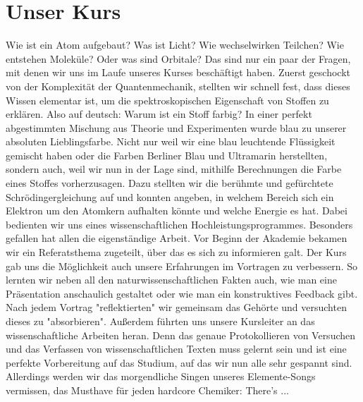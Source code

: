 \section{Unser Kurs}
Wie ist ein Atom aufgebaut? Was ist Licht? Wie wechselwirken Teilchen? Wie entstehen Moleküle? Oder was sind Orbitale?
Das sind nur ein paar der Fragen, mit denen wir uns im Laufe unseres Kurses beschäftigt haben. Zuerst geschockt von der Komplexität der Quantenmechanik, stellten wir schnell fest, dass dieses Wissen elementar ist, um die spektroskopischen Eigenschaft von Stoffen zu erklären. Also auf deutsch: Warum ist ein Stoff farbig? In einer perfekt abgestimmten Mischung aus Theorie und Experimenten wurde blau zu unserer absoluten Lieblingsfarbe. Nicht nur weil wir eine blau leuchtende Flüssigkeit gemischt haben oder die Farben Berliner Blau und Ultramarin herstellten, sondern auch, weil wir nun in der Lage sind, mithilfe Berechnungen die Farbe eines Stoffes vorherzusagen. Dazu stellten wir die berühmte und gefürchtete Schrödingergleichung auf und konnten angeben, in welchem Bereich sich ein Elektron um den Atomkern aufhalten könnte und welche Energie es hat. Dabei bedienten wir uns eines wissenschaftlichen Hochleistungsprogrammes. Besonders gefallen hat allen die eigenständige Arbeit. Vor Beginn der Akademie bekamen wir ein Referatsthema zugeteilt, über das es sich zu informieren galt. Der Kurs gab uns die Möglichkeit auch unsere Erfahrungen im Vortragen zu verbessern. So lernten wir neben all den naturwissenschaftlichen Fakten auch, wie man eine Präsentation anschaulich gestaltet oder wie man ein konstruktives Feedback gibt. Nach jedem Vortrag "reflektierten" wir gemeinsam das Gehörte und versuchten dieses zu "absorbieren". Außerdem führten uns unsere Kursleiter an das wissenschaftliche Arbeiten heran. Denn das genaue Protokollieren von Versuchen und das Verfassen von wissenschaftlichen Texten muss gelernt sein und ist eine perfekte Vorbereitung auf das Studium, auf das wir nun alle sehr gespannt sind. Allerdings werden wir das morgendliche Singen unseres Elemente-Songs vermissen, das Musthave für jeden hardcore Chemiker:
There's ...